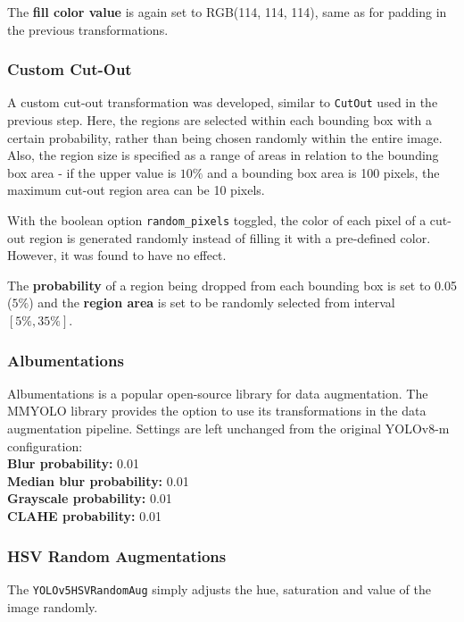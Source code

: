 The \textbf{fill color value} is again set to RGB(114, 114, 114), same as for
padding in the previous transformations.

\subsubsection*{Custom Cut-Out}

A custom cut-out transformation was developed, similar to \texttt{CutOut} used
in the previous step. Here, the regions are selected within each bounding box
with a certain probability, rather than being chosen randomly within the entire image.
Also, the region size is specified as a range of areas in relation to the
bounding box area - if the upper value is $10\%$ and a bounding box area is 100
pixels, the maximum cut-out region area can be 10 pixels.

With the boolean option \texttt{random\_pixels} toggled, the color of each pixel
of a cut-out region is generated randomly instead of filling it with a
pre-defined color. However, it was found to have no effect.

The \textbf{probability} of a region being dropped from each bounding box is set
to \num{0.05} ($5 \%$) and the \textbf{region area} is set to be randomly selected from
interval $[5\%, 35\%]$.

\subsubsection*{Albumentations}

Albumentations \cite{Albumentations} is a popular open-source library for data
augmentation. The MMYOLO library provides the option to use its transformations
in the data augmentation pipeline. Settings are left unchanged from the original
YOLOv8-m configuration: \\
\textbf{Blur probability:} 0.01 \\
\textbf{Median blur probability:} 0.01 \\
\textbf{Grayscale probability:} 0.01 \\
\textbf{CLAHE probability:} 0.01

\subsubsection*{HSV Random Augmentations}

The \texttt{YOLOv5HSVRandomAug} simply adjusts the hue, saturation and value of
the image randomly.

